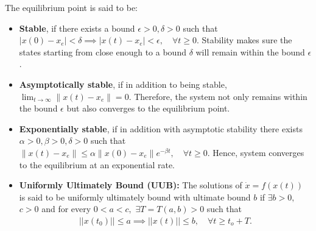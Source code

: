 The equilibrium point is said to be:
\begin{itemize}
    \item \textbf{Stable}, if there exists a bound $\epsilon > 0, \delta > 0$ such that $|x(0) - x_e| < \delta \implies |x(t) - x_e| < \epsilon, \quad \forall t \geq 0$. Stability makes sure the states starting from close enough to a bound $\delta$ will remain within the bound $\epsilon$.
    \item \textbf{Asymptotically stable}, if in addition to being stable, $\lim _{t\rightarrow \infty }\|x(t)-x_{e}\|=0$. Therefore, the system not only remains within the bound $\epsilon$ but also converges to the equilibrium point.
    \item \textbf{Exponentially stable}, if in addition with asymptotic stability there exists $ \alpha >0,\beta >0,\delta >0$ such that $\|x(t)-x_{e}\|\leq \alpha \|x(0)-x_{e}\|e^{-\beta t}, \quad \forall  t\geq 0$. Hence, system converges to the equilibrium at an exponential rate.
    \item \textbf{Uniformly Ultimately Bound (UUB):}
The solutions of $\dot{x} = f(x(t))$ is said to be uniformly ultimately bound with ultimate bound $b$ if $\exists b > 0,$ $c > 0$ and for every $0 < a < c,$ $\exists T = T(a,b) > 0$ such that
\begin{align}
    ||x(t_0)|| \leq a \implies  ||x(t)|| \leq b, \quad \forall t\geq t_o + T.
\end{align}
    
\end{itemize}




